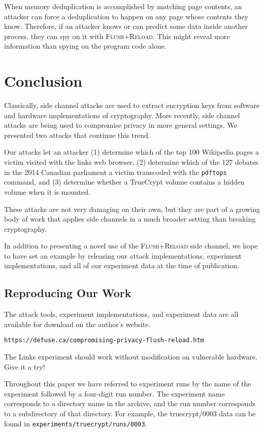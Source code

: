 \documentclass[letterpaper,twocolumn,10pt]{article}
\begin{document}
When memory deduplication is accomplished by matching page contents, an attacker
can force a deduplication to happen on any page whose contents they know.
Therefore, if an attacker knows or can predict some data inside another process,
they can spy on it with \textsc{Flush+Reload}. This might reveal more
information than spying on the program code alone.

\section{Conclusion}
\label{sec:conclusion}

Classically, side channel attacks are used to extract encryption keys from
software and hardware implementations of cryptography. More recently, side
channel attacks are being used to compromise privacy in more general settings.
We presented two attacks that continue this trend. 

Our attacks let an attacker (1) determine which of the top 100 Wikipedia pages
a victim visited with the links web browser, (2) determine which of the 127
debates in the 2014 Canadian parliament a victim transcoded with the
\texttt{pdftops} command, and (3) determine whether a TrueCrypt volume contains
a hidden volume when it is mounted.

These attacks are not very damaging on their own, but they are part of a growing
body of work that applies side channels in a much broader setting than breaking
cryptography. 

In addition to presenting a novel use of the \textsc{Flush+Reload} side channel,
we hope to have set an example by releasing our attack implementations,
experiment implementations, and all of our experiment data at the time of
publication.

{\footnotesize 
}

\theendnotes

\begin{appendices}
    \section{Reproducing Our Work}
    \label{sec:reproducing}

    The attack tools, experiment implementations, and experiment data are all
    available for download on the author's website.

    \texttt{https://defuse.ca/compromising-privacy-flush-reload.htm}

%
%
    The Links experiment should work without modification on vulnerable
    hardware. Give it a try!

    Throughout this paper we have referred to experiment runs by the name of the
    experiment followed by a four-digit run number. The experiment name
    corresponds to a directory name in the archive, and the run number
    corresponds to a subdirectory of that directory. For example, the
    truecrypt/0003 data can be found in
    \texttt{experiments/truecrypt/runs/0003}.
\end{appendices}
\end{document}
